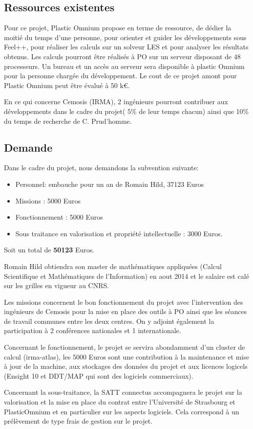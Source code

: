 \documentclass[12pt]{article}
\begin{document}
\subsection{Ressources existentes}

Pour ce projet, Plastic Omnium propose en terme de ressource, de dédier la
moitié du temps d’une personne, pour orienter et guider les développements sous
Feel++, pour réaliser les calculs sur un solveur LES et pour analyser les
résultats obtenus. Les calculs pourront être réalisés à PO sur un serveur
disposant de 48 processeurs. Un bureau et un accès au serveur sera disponible à
plastic Omnium pour la personne chargée du développement. Le cout de ce projet
amont pour Plastic Omnium peut être évalué à 50 k€.

En ce qui concerne Cemosis (IRMA), 2 ingénieurs pourront contribuer aux
développements dans le cadre du projet( 5\% de leur temps chacun) ainsi que 10\%
du temps de recherche de C. Prud'homme.

\subsection{Demande}


Dans le cadre du projet, nous demandons la subvention suivante:
\begin{itemize}
\item Personnel: embauche pour un an de Romain Hild, 37123 Euros
\item Missions : 5000 Euros
\item Fonctionnement  : 5000 Euros
\item Sous traitance en valorisation et propriété intellectuelle : 3000 Euros.
\end{itemize}
Soit un total de \textbf{50123} Euros.

Romain Hild obtiendra son master de mathématiques appliquées (Calcul
Scientifique et Mathématiques de l'Information) en aout 2014 et le salaire est
calé sur les grilles en vigueur au CNRS.

Les missions concernent le bon fonctionnement du projet avec l'intervention des
ingénieurs de Cemosis pour la mise en place des outils à PO ainsi que les
séances de travail communes entre les deux centres. On y adjoint également la
participation à 2 conférences nationales et 1 internationale.

Concernant le fonctionnement, le projet se servira abondamment d'un cluster de
calcul (irma-atlas), les 5000 Euros sont une contribution à la maintenance et
mise à jour de la machine, aux stockages des données du projet et aux licences
logicels (Ensight 10 et DDT/MAP qui sont des logiciels commerciaux).

Concernant la sous-traitance, la SATT connectus accompagnera le projet sur la
valorisation et la mise en place du contrat entre l'Université de Strasbourg et
PlasticOmnium et en particulier sur les aspects logiciels. Cela correspond à un
prélèvement de type frais de gestion sur le projet.




\end{document}
